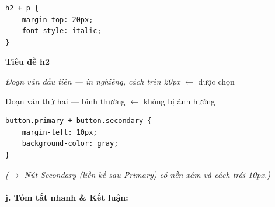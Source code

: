 \begin{codeWindow}
\begin{lstlisting}[language=CSS3]
h2 + p {
    margin-top: 20px;
    font-style: italic;
}
\end{lstlisting}
\end{codeWindow}

\begin{browserWindow}
\sffamily\small
{\bfseries\large\textcolor{darkText}{Tiêu đề h2}} \par\vspace{4pt}
\textcolor{darkText}{\textit{Đoạn văn đầu tiên --- in nghiêng, cách trên 20px}} {\small\textcolor{gray!60}{$\leftarrow$ được chọn}} \par\vspace{2pt}
\textcolor{darkText}{Đoạn văn thứ hai --- bình thường} {\small\textcolor{gray!60}{$\leftarrow$ không bị ảnh hưởng}}
\end{browserWindow}

\begin{codeWindow}
\begin{lstlisting}[language=CSS3]
button.primary + button.secondary {
    margin-left: 10px;
    background-color: gray;
}
\end{lstlisting}
\end{codeWindow}

\begin{browserWindow}
\sffamily\small
{} \hspace{10pt}
 \par\vspace{4pt}
\textcolor{gray!70}{\small\textit{($\rightarrow$ Nút Secondary (liền kề sau Primary) có nền xám và cách trái 10px.)}}
\end{browserWindow}

\paragraph{j. Tóm tắt nhanh \& Kết luận:}

